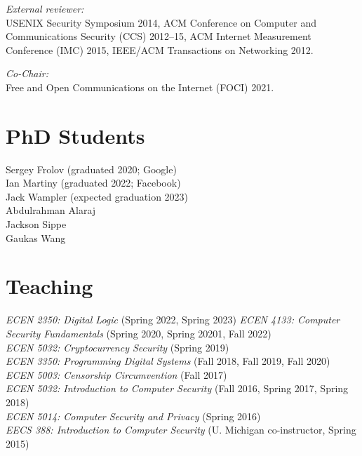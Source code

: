 \documentclass[margin,11pt]{res} %
\begin{document}
    \emph{External reviewer:}\\
    USENIX Security Symposium 2014,
    ACM Conference on Computer and Communications Security (CCS) 2012--15,
    ACM Internet Measurement Conference (IMC) 2015,
    IEEE/ACM Transactions on Networking 2012.

    \emph{Co-Chair:}\\
    Free and Open Communications on the Internet (FOCI) 2021.

\vspace{6pt}
\section{\large PhD Students}
    Sergey Frolov (graduated 2020; Google) \\
    Ian Martiny (graduated 2022; Facebook) \\
    Jack Wampler (expected graduation 2023) \\ %
    Abdulrahman Alaraj \\   %
    Jackson Sippe \\ %
    Gaukas Wang \\ %

\vspace{6pt}
\section{\large Teaching}
    \emph{ECEN 2350: Digital Logic} (Spring 2022, Spring 2023)
    \emph{ECEN 4133: Computer Security Fundamentals} (Spring 2020, Spring 20201, Fall 2022)\\
    \emph{ECEN 5032: Cryptocurrency Security} (Spring 2019)\\
    \emph{ECEN 3350: Programming Digital Systems} (Fall 2018, Fall 2019, Fall 2020)\\
    \emph{ECEN 5003: Censorship Circumvention} (Fall 2017)\\
    \emph{ECEN 5032: Introduction to Computer Security} (Fall 2016, Spring 2017, Spring 2018)\\
    \emph{ECEN 5014: Computer Security and Privacy} (Spring 2016)\\
    \emph{EECS 388: Introduction to Computer Security}  (U. Michigan co-instructor, Spring 2015)\\
\end{document}
